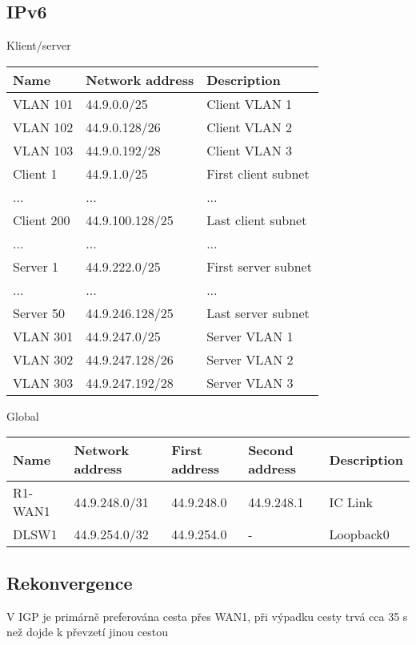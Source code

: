 \documentclass[czech,master,dept460,male,cpp,cpdeclaration]{diploma}
\begin{document}
\subsection{IPv6}
\label{subsec:Sec042}
\noindent Klient/server
\begin{center}
	\begin{tabular}{l|l|l}
		Name & Network address & Description \\
		\hline
		VLAN 101 & 44.9.0.0/25 & Client VLAN 1\\
		VLAN 102 & 44.9.0.128/26 & Client VLAN 2\\
		VLAN 103 & 44.9.0.192/28 & Client VLAN 3\\
		Client 1 & 44.9.1.0/25 & First client subnet\\
		... & ... & ...\\
		Client 200 & 44.9.100.128/25 & Last client subnet\\
		... & ... & ...\\
		Server 1 & 44.9.222.0/25 & First server subnet\\
		... & ... & ...\\
		Server 50 & 44.9.246.128/25 & Last server subnet\\
		VLAN 301 & 44.9.247.0/25 & Server VLAN 1\\
		VLAN 302 & 44.9.247.128/26 & Server VLAN 2\\
		VLAN 303 & 44.9.247.192/28 & Server VLAN 3\\
	\end{tabular}
\end{center}

\noindent Global
\begin{center}
	\begin{tabular}{l|l|l|l|l}
		Name & Network address & First address & Second address & Description \\
		\hline
		R1-WAN1 & 44.9.248.0/31 & 44.9.248.0 & 44.9.248.1 & IC Link \\
		\hline
		DLSW1 & 44.9.254.0/32 & 44.9.254.0 & - & Loopback0 \\
	\end{tabular}
\end{center}



\subsection{Rekonvergence}
\label{subsec:Sec043}
\noindent V IGP je primárně preferována cesta přes WAN1, při výpadku cesty trvá cca 35 s než dojde k převzetí jinou cestou
\end{document}
